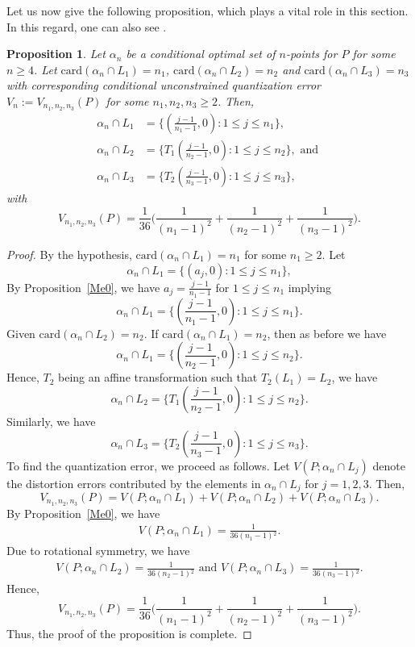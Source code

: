 \documentclass[12pt, reqno]{amsart}
\theoremstyle{plain}
\newtheorem{prop}[subsection]{Proposition}
\theoremstyle{definition}
\newcommand{\ii}{\cap}%
\newcommand{\set}[1]{\{#1\}}%
\newcommand{\ga}{\alpha}
\newcommand{\te}{\text}%
\begin{document}
Let us now give the following proposition, which plays a vital role in this section. In this regard, one can also see \cite{RR}.

\begin{prop} \label{Me2} 
Let $\ga_n$ be a conditional optimal set of $n$-points for $P$ for some $n\geq 4$. Let $\te{card}(\ga_n\ii L_1)=n_1$, $\te{card}(\ga_n\ii L_2)=n_2$ and $\te{card}(\ga_n\ii L_3)=n_3$  with corresponding conditional unconstrained quantization error $V_n:=V_{n_1, n_2, n_3}(P)$ for some $n_1, n_2, n_3\geq 2$. Then, 
\begin{align*}
\ga_n\ii L_1& =\Big\{(\frac{j-1}{n_1-1}, 0) : 1\leq j\leq n_1\Big\},\\
 \ga_n\ii L_2&=\Big\{T_1(\frac{j-1}{n_2-1}, 0) : 1\leq j\leq n_2\Big\}, \te{ and } \\
 \ga_n\ii L_3&=\Big\{T_2(\frac{j-1}{n_3-1}, 0) : 1\leq j\leq n_3\Big\},
\end{align*}
with  
\[V_{n_1, n_2, n_3}(P)=\frac{1}{36} \Big(\frac 1{(n_1-1)^2}+\frac 1{(n_2-1)^2}+\frac 1{(n_3-1)^2}\Big).\]
\end{prop} 
 
 \begin{proof}
By the hypothesis,  $\te{card}(\ga_n\ii L_1)=n_1$ for some $n_1\geq 2$.
Let \begin{equation}
\ga_n\ii L_1=\set{(a_j, 0) : 1\leq j\leq n_1},
\end{equation} 
By Proposition~\ref{Me0}, we have $a_j=\frac{j-1}{n_1-1}$ for $1\leq j\leq n_1$ implying 
\[\ga_n\ii L_1=\set{(\frac{j-1}{n_1-1}, 0) : 1\leq j\leq n_1}.\] 
Given $\te{card}(\ga_n\ii L_2)=n_2$. If $\te{card}(\ga_n\ii L_1)=n_2$, then as before we have 
\[\ga_n\ii L_1=\set{(\frac{j-1}{n_2-1}, 0) : 1\leq j\leq n_2}.\] 
Hence, $T_2$ being an affine transformation such that $T_2(L_1)=L_2$, we have 
\[\ga_n\ii L_2=\set{T_1(\frac{j-1}{n_2-1}, 0) : 1\leq j\leq n_2}.\] 
Similarly, we have 
\[\ga_n\ii L_3=\set{T_2(\frac{j-1}{n_3-1}, 0) : 1\leq j\leq n_3}.\] 
To find the quantization error, we proceed as follows.  Let $V(P; \ga_n\ii L_j)$ denote the distortion errors contributed by the elements in $\ga_n\ii L_j$ for $j=1,2,3$.
Then,  \[V_{n_1, n_2, n_3}(P)=V(P; \ga_n\ii L_1)+V(P; \ga_n\ii L_2)+V(P; \ga_n\ii L_3).\]
By Proposition~\ref{Me0}, we have
\begin{align*}
V(P; \ga_n\ii L_1)=\frac{1}{36 \left(n_1-1\right){}^2}.
\end{align*} 
Due to rotational symmetry, we have 
\begin{align*}
V(P; \ga_n\ii L_2)=\frac{1}{36 \left(n_2-1\right){}^2} \te{ and } V(P; \ga_n\ii L_3)=\frac{1}{36 \left(n_3-1\right){}^2}.
\end{align*} 
Hence, 
\[V_{n_1, n_2, n_3}(P)=\frac{1}{36} \Big(\frac 1{(n_1-1)^2}+\frac 1{(n_2-1)^2}+\frac 1{(n_3-1)^2}\Big).\]
Thus, the proof of the proposition is complete. 
\end{proof} 
\end{document}
